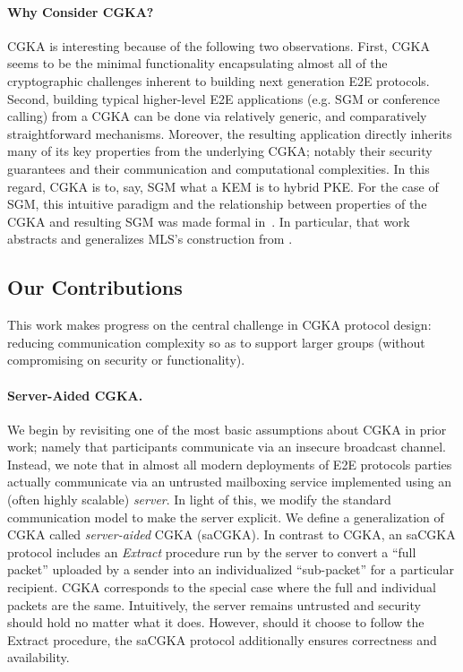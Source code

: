 \paragraph{Why Consider CGKA?}
CGKA is interesting because of the following two observations. First, CGKA
seems to be the minimal functionality encapsulating almost all of the
cryptographic challenges inherent to building next generation E2E protocols.
Second, building typical higher-level E2E applications (e.g. SGM or
conference calling) from a CGKA can be done via relatively generic, and
comparatively straightforward mechanisms. Moreover, the resulting application
directly inherits many of its key properties from the underlying CGKA;
notably their security guarantees and their communication and computational
complexities. In this regard, CGKA is to, say, SGM what a KEM is to hybrid
PKE. For the case of SGM, this intuitive paradigm and the relationship
between properties of the CGKA and resulting SGM was made formal
in~\cite{CCS:ACDT21}. In particular, that work abstracts and generalizes
MLS's construction from \protITK.

\subsection{Our Contributions}
This work makes progress on the central challenge in CGKA protocol design:
reducing communication complexity so as to support larger groups (without
compromising on security or functionality).

\paragraph{Server-Aided CGKA.}
We begin by revisiting one of the most basic assumptions about
CGKA in prior work; namely that participants communicate via an insecure
broadcast channel. Instead, we note that in almost all modern deployments of
E2E protocols parties actually communicate via an untrusted mailboxing
service implemented using an (often highly scalable) \emph{server}.
In light of this, we modify the standard communication model to make the
server explicit. We define a generalization of CGKA 
called \emph{server-aided} CGKA (saCGKA). In contrast to CGKA, an saCGKA
protocol includes an \emph{Extract} procedure run by the server to convert a
``full packet'' uploaded by a sender into an individualized ``sub-packet'' for a particular recipient.
 CGKA corresponds to
the special case where the full and individual packets are the same.
Intuitively, the server remains untrusted and security should hold no matter
what it does. However, should it choose to follow the Extract procedure, the
saCGKA protocol additionally ensures correctness and availability.


